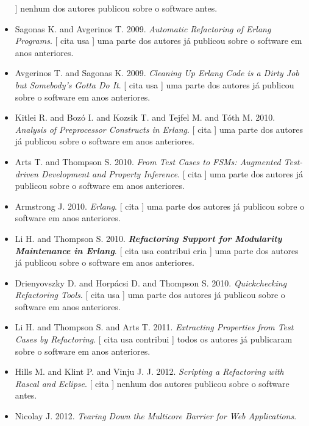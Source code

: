 \begin{itemize}
      ]
nenhum dos autores publicou sobre o software antes.
\item Sagonas K. and Avgerinos T.
      2009.
        \textit{ Automatic Refactoring of Erlang Programs}.
      [
          cita
          usa
      ]
uma parte dos autores já publicou sobre o software em anos anteriores.
\item Avgerinos T. and Sagonas K.
      2009.
        \textit{ Cleaning Up Erlang Code is a Dirty Job but Somebody's Gotta Do It}.
      [
          cita
          usa
      ]
uma parte dos autores já publicou sobre o software em anos anteriores.
\item Kitlei R. and Boz\'{o} I. and Kozsik T. and Tejfel M. and T\'{o}th M.
      2010.
        \textit{ Analysis of Preprocessor Constructs in Erlang}.
      [
          cita
      ]
uma parte dos autores já publicou sobre o software em anos anteriores.
\item Arts T. and Thompson S.
      2010.
        \textit{ From Test Cases to FSMs: Augmented Test-driven Development and Property Inference}.
      [
          cita
      ]
uma parte dos autores já publicou sobre o software em anos anteriores.
\item Armstrong J.
      2010.
        \textit{ Erlang}.
      [
          cita
      ]
uma parte dos autores já publicou sobre o software em anos anteriores.
\item Li H. and Thompson S.
      2010.
        \textbf{\textit{ Refactoring Support for Modularity Maintenance in Erlang}}.
      [
          cita
          usa
          contribui
          cria
      ]
uma parte dos autores já publicou sobre o software em anos anteriores.
\item Drienyovszky D. and Horp\'{a}csi D. and Thompson S.
      2010.
        \textit{ Quickchecking Refactoring Tools}.
      [
          cita
          usa
      ]
uma parte dos autores já publicou sobre o software em anos anteriores.
\item Li H. and Thompson S. and Arts T.
      2011.
        \textit{ Extracting Properties from Test Cases by Refactoring}.
      [
          cita
          usa
          contribui
      ]
todos os autores já publicaram sobre o software em anos anteriores.
\item Hills M. and Klint P. and Vinju J. J.
      2012.
        \textit{ Scripting a Refactoring with Rascal and Eclipse}.
      [
          cita
      ]
nenhum dos autores publicou sobre o software antes.
\item Nicolay J.
      2012.
        \textit{ Tearing Down the Multicore Barrier for Web Applications}.

\end{itemize}
